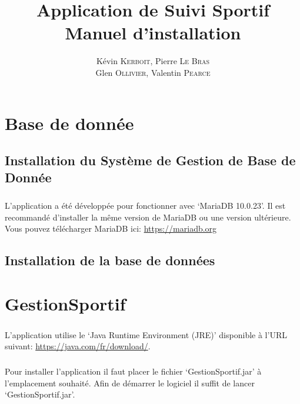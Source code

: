 \documentclass[french,12pt,a4paper,openany]{book}
\author{Kévin \textsc{Kerboit}, Pierre \textsc{Le Bras}\\Glen \textsc{Ollivier}, Valentin \textsc{Pearce}}
\date{}
\begin{document}
\title{Application de Suivi Sportif \\ Manuel d'installation}
\maketitle
\tableofcontents
\chapter{Base de donnée}
\section{Installation du Système de Gestion de Base de Donnée}
\paragraph{}{L'application a été développée pour fonctionner avec `MariaDB 10.0.23'. Il est recommandé d'installer la même version de MariaDB ou une version ultérieure. Vous pouvez télécharger MariaDB ici: \url{https://mariadb.org} }
\section{Installation de la base de données}
\paragraph{}{}

\chapter{GestionSportif}
\paragraph{}{L'application utilise le `Java Runtime Environment (JRE)' disponible à l'URL suivant:  \url{https://java.com/fr/download/}.}
\paragraph{}{Pour installer l'application il faut placer le fichier `GestionSportif.jar' à l'emplacement souhaité. Afin de démarrer le logiciel il suffit de lancer `GestionSportif.jar'.}
\end{document}

